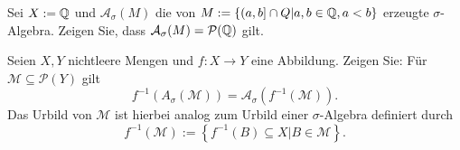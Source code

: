\begin{Problem}
	\begin{parts}
		
	\item Sei $X := \mathbb{Q}$ und $\mathcal A_\sigma (M)$ die von $M := \{(a, b] \cap Q | a, b \in \mathbb{Q}, a < b\}$ erzeugte $\sigma$-Algebra. Zeigen Sie, dass $\mathcal A_\sigma (M ) = \mathcal{P}(\mathbb{Q})$ gilt.

 \item Seien $X, Y$ nichtleere Mengen und $f:X\to Y$ eine Abbildung. Zeigen Sie: F\"{u}r $\mathcal M\subseteq \mathcal{P}(Y)$ gilt
	 \[
		 f^{-1}\left( A_\sigma(\mathcal M) \right) =\mathcal A_\sigma\left( f^{-1}(\mathcal M) \right) 
	 .\]
	 Das Urbild von $\mathcal M$ ist hierbei analog zum Urbild einer $\sigma$-Algebra definiert durch
	 \[
		 f^{-1}(\mathcal M):=\left\{ f^{-1}(B)\subseteq X|B\in \mathcal M \right\} 
	 .\] 
	\end{parts}
\end{Problem}

